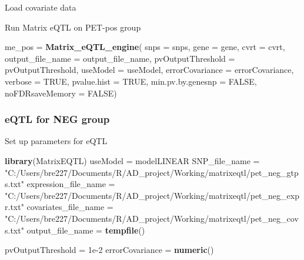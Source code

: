 \documentclass[]{article}
\newenvironment{Shaded}{\begin{snugshade}}{\end{snugshade}}
\newcommand{\KeywordTok}[1]{\textcolor[rgb]{0.13,0.29,0.53}{\textbf{#1}}}
\newcommand{\DataTypeTok}[1]{\textcolor[rgb]{0.13,0.29,0.53}{#1}}
\newcommand{\DecValTok}[1]{\textcolor[rgb]{0.00,0.00,0.81}{#1}}
\newcommand{\FloatTok}[1]{\textcolor[rgb]{0.00,0.00,0.81}{#1}}
\newcommand{\CharTok}[1]{\textcolor[rgb]{0.31,0.60,0.02}{#1}}
\newcommand{\StringTok}[1]{\textcolor[rgb]{0.31,0.60,0.02}{#1}}
\newcommand{\OtherTok}[1]{\textcolor[rgb]{0.56,0.35,0.01}{#1}}
\newcommand{\OperatorTok}[1]{\textcolor[rgb]{0.81,0.36,0.00}{\textbf{#1}}}
\newcommand{\NormalTok}[1]{#1}
\begin{document}
Load covariate data

\begin{Shaded}
\end{Shaded}

Run Matrix eQTL on PET-pos group

\begin{Shaded}
\begin{Highlighting}[]
\NormalTok{ me_pos =}\StringTok{ }\KeywordTok{Matrix_eQTL_engine}\NormalTok{(}
    \DataTypeTok{snps =}\NormalTok{ snps,}
    \DataTypeTok{gene =}\NormalTok{ gene,}
    \DataTypeTok{cvrt =}\NormalTok{ cvrt,}
    \DataTypeTok{output_file_name =}\NormalTok{ output_file_name,}
    \DataTypeTok{pvOutputThreshold =}\NormalTok{ pvOutputThreshold,}
    \DataTypeTok{useModel =}\NormalTok{ useModel, }
    \DataTypeTok{errorCovariance =}\NormalTok{ errorCovariance, }
    \DataTypeTok{verbose =} \OtherTok{TRUE}\NormalTok{,}
    \DataTypeTok{pvalue.hist =} \OtherTok{TRUE}\NormalTok{,}
    \DataTypeTok{min.pv.by.genesnp =} \OtherTok{FALSE}\NormalTok{,}
    \DataTypeTok{noFDRsaveMemory =} \OtherTok{FALSE}\NormalTok{)}
\end{Highlighting}
\end{Shaded}

\subsubsection{eQTL for NEG group}\label{eqtl-for-neg-group}

Set up parameters for eQTL

\begin{Shaded}
\begin{Highlighting}[]
\KeywordTok{library}\NormalTok{(MatrixEQTL)}
\NormalTok{useModel =}\StringTok{ }\NormalTok{modelLINEAR}
\NormalTok{SNP_file_name =}\StringTok{ "C:/Users/bre227/Documents/R/AD_project/Working/matrixeqtl/pet_neg_gtps.txt"}
\NormalTok{expression_file_name =}\StringTok{ "C:/Users/bre227/Documents/R/AD_project/Working/matrixeqtl/pet_neg_expr.txt"}
\NormalTok{covariates_file_name =}\StringTok{ "C:/Users/bre227/Documents/R/AD_project/Working/matrixeqtl/pet_neg_covs.txt"}
\NormalTok{output_file_name =}\StringTok{ }\KeywordTok{tempfile}\NormalTok{()}

\NormalTok{pvOutputThreshold =}\StringTok{ }\FloatTok{1e-2}
\NormalTok{errorCovariance =}\StringTok{ }\KeywordTok{numeric}\NormalTok{()}
\end{Highlighting}
\end{Shaded}
\end{document}
